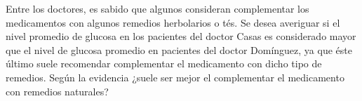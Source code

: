 \documentclass[12pt]{article}
\newenvironment{problem}[2][Problema]{\begin{trivlist}
\item[\hskip \labelsep {\bfseries #1}\hskip \labelsep {\bfseries #2.}]}{\end{trivlist}}
\begin{document}
\pagebreak
\begin{problem}{B}
Entre los doctores, es sabido que algunos consideran complementar los medicamentos con algunos remedios herbolarios o tés. Se desea averiguar si el nivel promedio de glucosa en los pacientes del doctor Casas es considerado mayor que el nivel de glucosa promedio en pacientes del doctor Domínguez, ya que éste último suele recomendar complementar el medicamento con dicho tipo de remedios.  Según la evidencia ¿suele ser mejor el complementar el medicamento con remedios naturales?

\end{problem}
\end{document}
